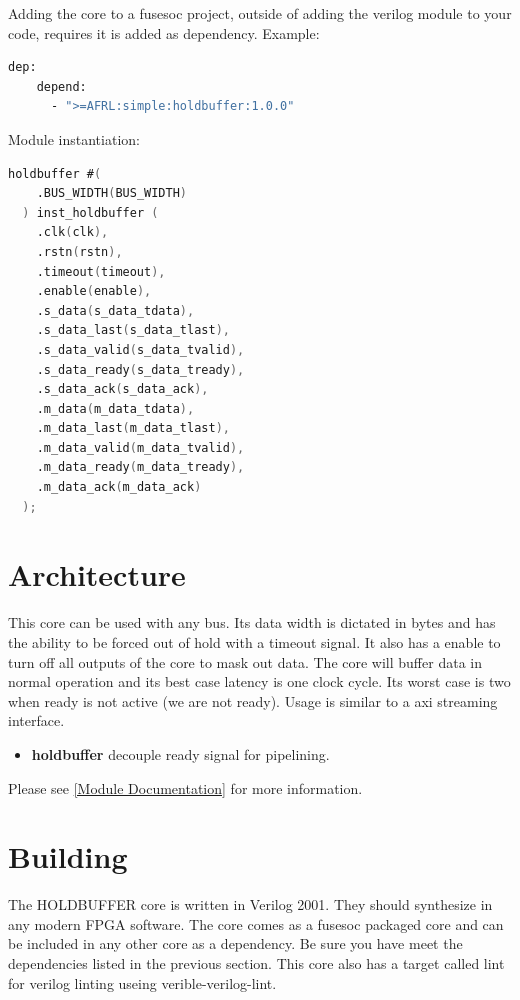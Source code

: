 Adding the core to a fusesoc project, outside of adding the verilog module to your code, requires it is added as dependency.
Example:
\begin{lstlisting}[language=bash]
  dep:
    depend:
      - ">=AFRL:simple:holdbuffer:1.0.0"
\end{lstlisting}

Module instantiation:
\begin{lstlisting}[language=Verilog]
  holdbuffer #(
    .BUS_WIDTH(BUS_WIDTH)
  ) inst_holdbuffer (
    .clk(clk),
    .rstn(rstn),
    .timeout(timeout),
    .enable(enable),
    .s_data(s_data_tdata),
    .s_data_last(s_data_tlast),
    .s_data_valid(s_data_tvalid),
    .s_data_ready(s_data_tready),
    .s_data_ack(s_data_ack),
    .m_data(m_data_tdata),
    .m_data_last(m_data_tlast),
    .m_data_valid(m_data_tvalid),
    .m_data_ready(m_data_tready),
    .m_data_ack(m_data_ack)
  );
\end{lstlisting}

\section{Architecture}
\par
This core can be used with any bus. Its data width is dictated in bytes and has the ability to be forced
out of hold with a timeout signal. It also has a enable to turn off all outputs of the core to mask out data.
The core will buffer data in normal operation and its best case latency is one clock cycle. Its worst case is 
two when ready is not active (we are not ready). Usage is similar to a axi streaming interface.

\begin{itemize}
  \item \textbf{holdbuffer} decouple ready signal for pipelining.
\end{itemize}

Please see \ref{Module Documentation} for more information.


\section{Building}

\par
The HOLDBUFFER core is written in Verilog 2001. They should synthesize in any modern FPGA software. The core comes as a fusesoc packaged core and can be included in any other core as a dependency. Be sure you have meet the dependencies listed in the previous section. This core also has a target called lint for verilog linting useing verible-verilog-lint.

